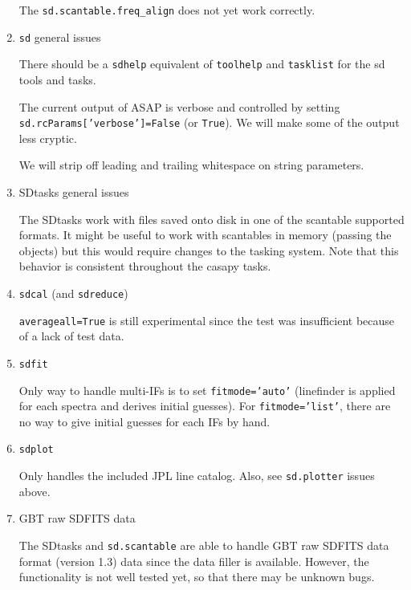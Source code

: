 \begin{enumerate}

  The {\tt sd.scantable.freq\_align} does not yet work correctly.


\item {\tt sd} general issues

  There should be a {\tt sdhelp} equivalent of {\tt toolhelp}
  and {\tt tasklist} for the sd tools and tasks.

  The current output of ASAP is verbose and controlled by
  setting {\tt sd.rcParams['verbose']=False} (or {\tt True}).
  We will make some of the output less cryptic.

  We will strip off leading and trailing whitespace on string parameters.

\item SDtasks general issues

  The SDtasks work with files saved onto disk in one of the 
  scantable supported formats.  It might be useful to
  work with scantables in memory (passing the objects) but this
  would require changes to the tasking system.  Note that this
  behavior is consistent throughout the casapy tasks.


\item {\tt sdcal} (and {\tt sdreduce})

  {\tt averageall=True} is still experimental since the test was insufficient 
  because of a lack of test data.

% 

\item {\tt sdfit}

%
Only way to handle multi-IFs is to set {\tt fitmode='auto'}
(linefinder is applied for each spectra and derives initial guesses).
For {\tt fitmode='list'}, there are no way to give initial guesses for each IFs by hand.

\item {\tt sdplot}

  Only handles the included JPL line catalog.  Also, see {\tt sd.plotter} issues above.

\item GBT raw SDFITS data

  The SDtasks and {\tt sd.scantable} are able to handle GBT raw SDFITS data format (version 1.3) data 
  since the data filler is available. However, the functionality is not well 
  tested yet, so that there may be unknown bugs.  

%

\end{enumerate}


